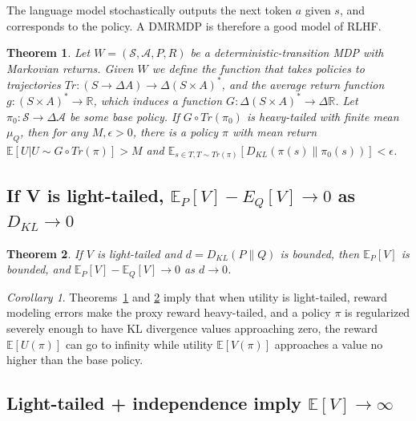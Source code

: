 \documentclass{article}
\theoremstyle{plain}
\newtheorem{theorem}{Theorem}
\theoremstyle{definition}
\theoremstyle{remark}
\begin{document}
The language model stochastically outputs the next token $a$ given $s$, and corresponds to the policy.
A DMRMDP is therefore a good model of RLHF.

\begin{theorem}
\label{thm2}
Let \(W = (\mathcal S, \mathcal A, P, R)\) be
a deterministic-transition MDP with Markovian returns. Given \(W\) we
define the function that takes policies to trajectories
\(Tr: (S \to \Delta A) \to \Delta(S \times A)^*\), and the average
return function \(g: (S \times A)^* \to \mathbb R\), which induces a
function \(G: \Delta(S \times A)^* \to \Delta \mathbb R\). Let
\(\pi_0: \mathcal S \to \Delta \mathcal A\) be some base policy. If
\(G \circ Tr(\pi_0)\) is heavy-tailed with finite mean \(\mu_Q\), then
for any \(M, \epsilon > 0\), there is a policy \(\pi\) with mean return
\(\mathbb E[U | U \sim G \circ Tr(\pi)] > M\) and
\(\mathbb E_{s \in T, T\sim Tr(\pi)}[D_{KL}(\pi(s) \| \pi_0(s))] < \epsilon\).
\end{theorem}

\subsection{If V is light-tailed, \texorpdfstring{$\mathbb E_P[V]\! -\! E_Q[V] \to 0$}{} as \texorpdfstring{$D_{KL}\! \to\! 0$}{}}

\begin{theorem}
\label{thm3} If \(V\) is light-tailed and \(d = D_{KL}(P \| Q)\) is bounded, then
\(\mathbb E_P[V]\) is bounded, and \(\mathbb E_P[V] - \mathbb E_Q[V] \to 0\) as
\(d \to 0\).
\end{theorem}

\newtheorem{corr}{Corollary}
\begin{corr}
\label{cor:heavy-tailed}
    Theorems~\ref{thm2} and \ref{thm3} imply that when utility is light-tailed, reward modeling errors make the proxy reward heavy-tailed, and a policy $\pi$ is regularized severely enough to have KL divergence values approaching zero, the reward $\mathbb E[U(\pi)]$ can go to infinity while utility $\mathbb E[V(\pi)]$ approaches a value no higher than the base policy.
\end{corr}

\hypertarget{light-tails-independence-imply-mathbb-ev-to-infty}{%
\subsection{\texorpdfstring{Light-tailed + independence imply
\(\mathbb E[V] \to \infty\)}{Light-tailed + independence imply \textbackslash mathbb EV \textbackslash to \textbackslash infty}}\label{light-tails-independence-imply-mathbb-ev-to-infty}}
 
\end{document}
